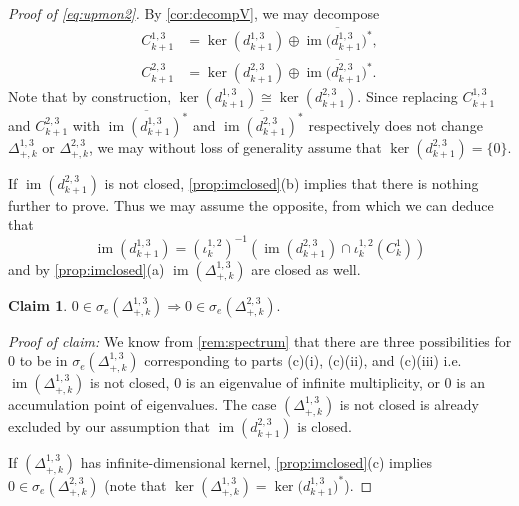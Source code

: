\documentclass[11pt]{article}
\newtheorem{claim}{Claim}[theorem]
\theoremstyle{definition}
\theoremstyle{remark}
\DeclareMathOperator{\im}{im}
\begin{document}
\begin{proof}[Proof of \cref{eq:upmon2}]
    By \cref{cor:decompV}, we may decompose
    \begin{align*}
        C_{k+1}^{1,3}&=\ker(d_{k+1}^{1,3})\oplus \overline{\im\big(d_{k+1}^{1,3}\big)^*},\\
        C_{k+1}^{2,3}&=\ker(d_{k+1}^{2,3})\oplus \overline{\im\big(d_{k+1}^{2,3}\big)^*}.
    \end{align*}
    Note that by construction, $\ker(d_{k+1}^{1,3}) \cong \ker(d_{k+1}^{2,3})$. Since replacing $C_{k+1}^{1,3}$ and $C_{k+1}^{2,3}$ with $\overline{\im(d_{k+1}^{1,3})^*}$ and $\overline{\im(d_{k+1}^{2,3})^*}$ respectively does not change $\Delta_{+,k}^{1,3}$ or $\Delta_{+,k}^{2,3}$, we may without loss of generality assume that $\ker(d_{k+1}^{2,3})=\{0\}$. 
    
    If $\im(d_{k+1}^{2,3})$ is not closed, \cref{prop:imclosed}(b) implies that there is nothing further to prove. Thus we may assume the opposite, from which we can deduce that
    $$
    \im(d_{k+1}^{1,3})=(\iota_k^{1,2})^{-1}\left(\im(d_{k+1}^{2,3})\cap \iota_k^{1,2}(C_k^1)\right)
    $$
    and by \cref{prop:imclosed}(a) $\im (\Delta^{1,3}_{+,k})$ are closed as well.
    \begin{claim} \label{claim:ess0}
        $0 \in \sigma_e(\Delta^{1,3}_{+,k}) \Rightarrow 0 \in \sigma_e(\Delta^{2,3}_{+,k}).$
    \end{claim}
    
    \textit{Proof of claim:} We know from \cref{rem:spectrum} that there are three possibilities for $0$ to be in $\sigma_e(\Delta^{1,3}_{+,k})$ corresponding to parts (c)(i), (c)(ii), and (c)(iii) i.e. $\im (\Delta^{1,3}_{+,k})$ is not closed, $0$ is an eigenvalue of infinite multiplicity, or $0$ is an accumulation point of eigenvalues. The case $(\Delta^{1,3}_{+,k})$ is not closed is already excluded by our assumption that $\im(d_{k+1}^{2,3})$ is closed.
    
    If $(\Delta^{1,3}_{+,k})$ has infinite-dimensional kernel, \cref{prop:imclosed}(c) implies $0 \in \sigma_e(\Delta^{2,3}_{+,k})$ (note that $\ker(\Delta^{1,3}_{+,k})=\ker\big(d_{k+1}^{1,3}\big)^*$).
    

\end{proof}
\end{document}
